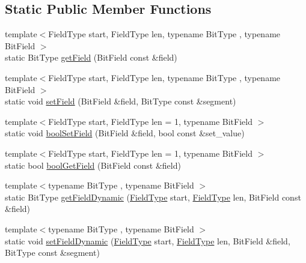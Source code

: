 \subsection*{Static Public Member Functions}
\begin{DoxyCompactItemize}
\item 
{\footnotesize template$<$Field\+Type start, Field\+Type len, typename Bit\+Type , typename Bit\+Field $>$ }\\static Bit\+Type \hyperlink{structvt_1_1utils_1_1_bit_packer_afe31d75cc9a9198eb732b759424a0535}{get\+Field} (Bit\+Field const \&field)
\item 
{\footnotesize template$<$Field\+Type start, Field\+Type len, typename Bit\+Type , typename Bit\+Field $>$ }\\static void \hyperlink{structvt_1_1utils_1_1_bit_packer_a4bffe5bd05d11955016e5f8f9161893b}{set\+Field} (Bit\+Field \&field, Bit\+Type const \&segment)
\item 
{\footnotesize template$<$Field\+Type start, Field\+Type len = 1, typename Bit\+Field $>$ }\\static void \hyperlink{structvt_1_1utils_1_1_bit_packer_ab5881dc40c79ea4043121a2394e603bc}{bool\+Set\+Field} (Bit\+Field \&field, bool const \&set\+\_\+value)
\item 
{\footnotesize template$<$Field\+Type start, Field\+Type len = 1, typename Bit\+Field $>$ }\\static bool \hyperlink{structvt_1_1utils_1_1_bit_packer_ad913a3121b60959166b1fba7de596cff}{bool\+Get\+Field} (Bit\+Field const \&field)
\item 
{\footnotesize template$<$typename Bit\+Type , typename Bit\+Field $>$ }\\static Bit\+Type \hyperlink{structvt_1_1utils_1_1_bit_packer_a0f6dd347c6375101ff5f4c9dd4e8413d}{get\+Field\+Dynamic} (\hyperlink{structvt_1_1utils_1_1_bit_packer_a23024285425933c1f10c8fc3942f9beb}{Field\+Type} start, \hyperlink{structvt_1_1utils_1_1_bit_packer_a23024285425933c1f10c8fc3942f9beb}{Field\+Type} len, Bit\+Field const \&field)
\item 
{\footnotesize template$<$typename Bit\+Type , typename Bit\+Field $>$ }\\static void \hyperlink{structvt_1_1utils_1_1_bit_packer_a9d000b5dcc34456e43cbff50fafa3fb9}{set\+Field\+Dynamic} (\hyperlink{structvt_1_1utils_1_1_bit_packer_a23024285425933c1f10c8fc3942f9beb}{Field\+Type} start, \hyperlink{structvt_1_1utils_1_1_bit_packer_a23024285425933c1f10c8fc3942f9beb}{Field\+Type} len, Bit\+Field \&field, Bit\+Type const \&segment)
\end{DoxyCompactItemize}


